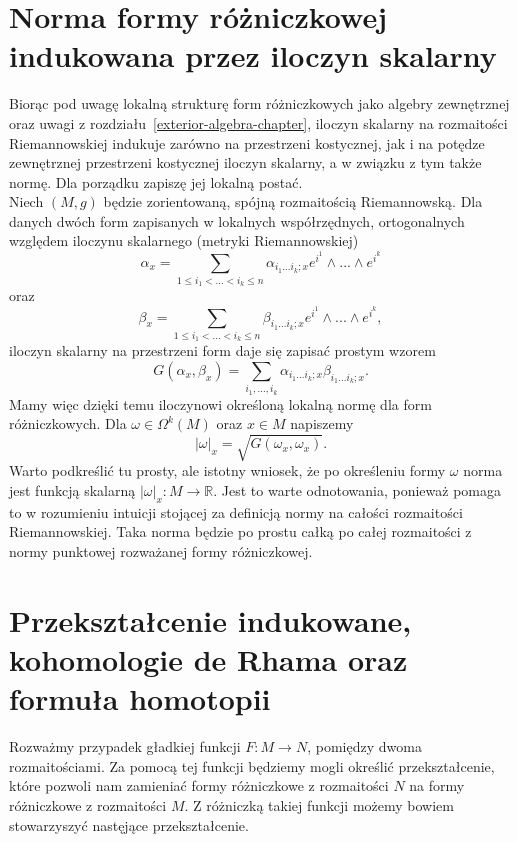 \documentclass[licencjacka]{pracamgr}
\theoremstyle{definition}
\theoremstyle{definition}
\theoremstyle{plain}
\theoremstyle{plain}
\theoremstyle{plain}
\theoremstyle{plain}
\begin{document}
\section{Norma formy różniczkowej indukowana przez iloczyn skalarny}
Biorąc pod uwagę lokalną strukturę form różniczkowych jako algebry
zewnętrznej oraz uwagi z rozdziału~\ref{exterior-algebra-chapter},
iloczyn skalarny na rozmaitości Riemannowskiej indukuje zarówno na
przestrzeni kostycznej, jak i na potędze zewnętrznej przestrzeni
kostycznej iloczyn skalarny, a w związku z tym także normę. Dla
porządku zapiszę jej lokalną postać. \\

Niech $(M, g)$ będzie zorientowaną, spójną 
rozmaitością Riemannowską.
Dla danych dwóch form zapisanych w lokalnych współrzędnych, ortogonalnych
względem iloczynu skalarnego (metryki Riemannowskiej)
\[
\alpha_x = \sum_{1 \leq i_1 < ... < i_k \leq n} \alpha_{i_1 ... i_k; x} e^{i^1}
\wedge ...  \wedge e^{i^k}
\]
 oraz
\[ \beta_x = \sum_{1 \leq i_1 < ... < i_k \leq n} \beta_{i_1 ... i_k; x} e^{i^1}
\wedge ...  \wedge e^{i^k},
\]
iloczyn skalarny na przestrzeni form daje się zapisać prostym wzorem
\[
    G(\alpha_x, \beta_x) = \sum_{i_1, ..., i_k} \alpha_{i_1 ... i_k; x}
                                                    \beta_{i_1 ... i_k; x}.
\] 
Mamy więc dzięki temu iloczynowi określoną lokalną normę dla form różniczkowych.
Dla $\omega \in \Omega^k(M)$ oraz $x \in M$ napiszemy
\[
    |\omega|_x = \sqrt{ G(\omega_x, \omega_x) }.
\]
Warto podkreślić tu prosty, ale istotny wniosek, że po określeniu formy
$\omega$ norma jest funkcją skalarną $| \omega |_x : M \rightarrow \mathbb{R}
$. Jest to warte odnotowania, ponieważ pomaga to w rozumieniu intuicji stojącej
za definicją normy na całości rozmaitości Riemannowskiej. Taka norma będzie po
prostu całką po całej rozmaitości z normy punktowej rozważanej formy
różniczkowej. \\


\section{Przekształcenie indukowane, kohomologie de Rhama oraz formuła
homotopii} Rozważmy przypadek gładkiej funkcji $F: M \rightarrow N$, pomiędzy
dwoma rozmaitościami. Za pomocą tej funkcji będziemy mogli określić
przekształcenie, które pozwoli nam zamieniać formy różniczkowe z rozmaitości
$N$ na formy różniczkowe z rozmaitości $M$. Z różniczką takiej funkcji możemy
bowiem stowarzyszyć nastęjące przekształcenie.
\end{document}
